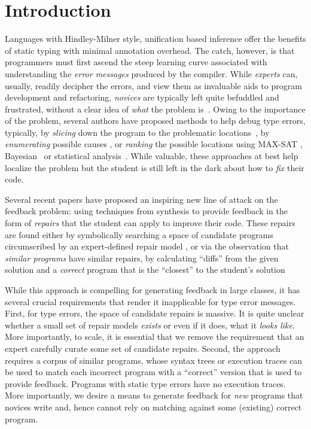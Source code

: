 \section{Introduction}
\label{sec:intro}

%
Languages with Hindley-Milner style, unification based inference 
offer the benefits of static typing with minimal annotation overhead.
The catch, however, is that programmers must first ascend the steep 
learning curve associated with understanding the \emph{error messages} 
produced by the compiler. 
%
While \emph{experts} can, usually, readily decipher the errors, and 
view them as invaluable aids to program development and refactoring,
\emph{novices} are typically left quite befuddled and frustrated, 
without a clear idea of \emph{what} the problem is~\cite{Wand1986-nw}.
%
Owing to the importance of the problem, several authors 
have proposed methods to help debug type errors, typically, 
by \emph{slicing} down the program to the problematic locations~\cite{Haack2003-vc, Rahli2015-tt}, 
by \emph{enumerating} possible causes \cite{Lerner2007-dt, Chen2014-gd},
or \emph{ranking} the possible locations using MAX-SAT 
\cite{Pavlinovic2014-mr}, Bayesian~\cite{Zhang2014-lv} 
or statistical analysis~\cite{Seidel:2017}.
%
While valuable, these approaches at best help localize 
the problem but the student is still left in the dark 
about how to \emph{fix} their code.

%
Several recent papers have proposed an inspiring new line of 
attack on the feedback problem: using techniques from synthesis 
to provide feedback in the form of \emph{repairs} that the student 
can apply to improve their code. 
%
These repairs are found either by symbolically searching a space 
of candidate programs circumscribed by an expert-defined repair 
model \cite{singh2013,HeadGSSFDH17}, or via the observation that 
\emph{similar programs} have similar repairs, \ie by calculating 
``diffs'' from the given solution and a \emph{correct} program 
that is the ``closest'' to the student's solution ~\cite{Gulwani_2018,Wang_2018}

While this approach is compelling for generating feedback in large
classes, it has several crucial requirements that render it inapplicable 
for type error messages.
%
First, for type errors, the space of candidate repairs is massive. 
It is quite unclear whether a small set of repair models \emph{exists} 
or even if it does, what it \emph{looks like}. More importantly, 
to scale, it is essential that we remove the requirement that an 
expert carefully curate some set of candidate repairs.
%
Second, the approach requires a corpus of similar programs, 
whose syntax trees or execution traces can be used to match 
each incorrect program with a ``correct'' version that is 
used to provide feedback. Programs with static type errors 
have no execution traces. 
%
More importantly, we desire a means to generate feedback 
for \emph{new} programs that novices write and, hence 
cannot rely on matching against some (existing) correct 
program.

